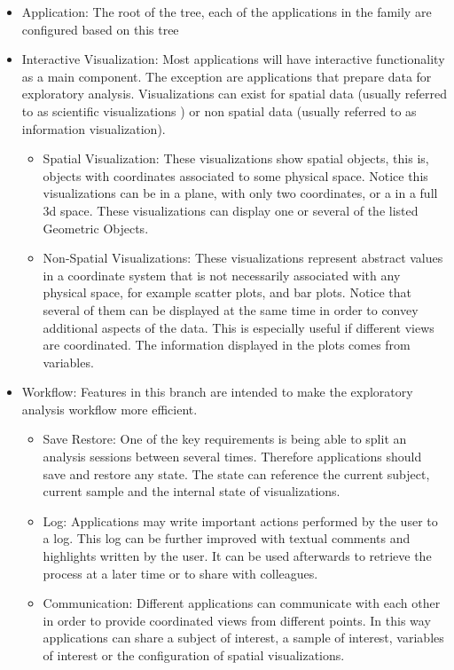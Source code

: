 \begin{itemize}
\item Application: The root of the tree, each of the applications in the family are configured based on this tree
\item Interactive Visualization: Most applications will have interactive functionality as a main component. The exception are applications that prepare data for exploratory analysis. Visualizations can exist for spatial data (usually referred to as scientific visualizations ) or non spatial data (usually referred to as information visualization).
\begin{itemize}
\item Spatial Visualization: These visualizations show spatial objects, this is, objects with coordinates associated to some physical space. Notice this visualizations can be in a plane, with only two coordinates, or a in a full 3d space. These visualizations can display one or several of the listed Geometric Objects.
\item Non-Spatial Visualizations: These visualizations represent abstract values in a coordinate system that is not necessarily associated with any physical space, for example scatter plots, and bar plots. Notice that several of them can be displayed at the same time in order to convey additional aspects of the data. This is especially useful if different views are coordinated. The information displayed in the plots comes from variables. 
\end{itemize}
\item Workflow: Features in this branch are intended to make the exploratory analysis workflow more efficient. 
\begin{itemize}
\item Save Restore: One of the key requirements is being able to split an analysis sessions between several times. Therefore applications should save and restore any state. The state can reference the current subject, current sample and the internal state of visualizations. 
\item Log: Applications may write important actions performed by the user to a log. This log can be further improved with textual comments and highlights written by the user. It can be used afterwards to retrieve the process at a later time or to share with colleagues.
\item Communication: Different applications can communicate with each other in order to provide coordinated views from different points. In this way applications can share a subject of interest, a sample of interest, variables of interest or the configuration of spatial visualizations.

\end{itemize}
\end{itemize}
